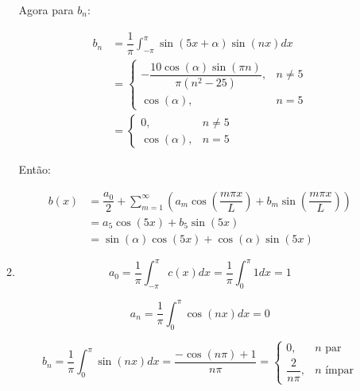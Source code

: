\documentclass{article}
\begin{document}
\begin{enumerate}
\begin{enumerate}
                        Agora para $b_n$:

                        \begin{align*}
                            b_n &= \dfrac{1}{\pi} \int_{-\pi}^{\pi} \sin(5x + \alpha) \sin(nx) dx \\
                            &= \begin{cases}
                                -\dfrac{10\cos(\alpha)\sin(\pi n)}{\pi(n^2-25)}, & n \ne 5\\
                                \cos(\alpha), & n = 5
                            \end{cases} \\
                            &= \begin{cases}
                                0, & n \ne 5\\
                                \cos(\alpha), & n = 5
                            \end{cases}
                        \end{align*}

                        Então:
                        
                        \begin{align*}
                            b(x) &= \dfrac{a_0}{2} + \sum_{m=1}^{\infty} \left(a_m \cos \left(\dfrac{m \pi x}{L}\right) + b_m \sin \left(\dfrac{m \pi x}{L}\right)\right) \\
                            &= a_5 \cos(5x) + b_5 \sin(5x) \\
                            &= \sin(\alpha) \cos(5x) + \cos(\alpha) \sin(5x)
                        \end{align*}

                    \item
                        $$a_0 = \dfrac{1}{\pi} \int_{-\pi}^{\pi}c(x)dx = \dfrac{1}{\pi} \int_{0}^{\pi} 1 dx = 1$$

                        $$a_n = \dfrac{1}{\pi} \int_{0}^{\pi} \cos(nx) dx = 0$$

                        $$b_n = \dfrac{1}{\pi} \int_{0}^{\pi} \sin(nx) dx
                        = \dfrac{-\cos(n\pi)+1}{n\pi} = \begin{cases}
                            0, &n \text{ par} \\
                            \dfrac{2}{n\pi}, &n \text{ ímpar}
                        \end{cases}$$


\end{enumerate}
\end{enumerate}
\end{document}
